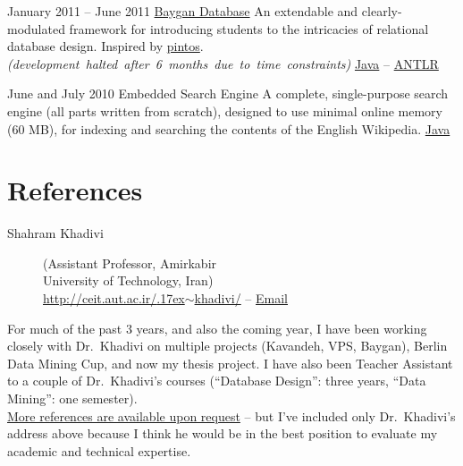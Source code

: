 \documentclass{tccv}
\renewcommand{\tilde}{\raise.17ex\hbox{$\scriptstyle\sim$}}
\begin{document}
{{\begin{project_list}
\vspace{-6pt}

\item{January 2011 -- June 2011}
	 {}
	 {\href{https://github.com/baygan/Baygan}{Baygan Database}}
	 {An extendable and clearly-modulated framework for introducing students to the intricacies of relational database design. Inspired by \href{http://www.stanford.edu/class/cs140/projects/pintos/pintos.html}{pintos}.\\[1.5pt]%
\mbox{\small\it(development halted after 6 months due to time constraints)}%
}
	 {%
	 	\href{http://www.oracle.com/technetwork/java/}{Java} -- %
		\href{http://www.antlr.org}{ANTLR}%
	 }

\vspace{-6pt}
	 
\item{June and July 2010}
	 {}
	 {Embedded Search Engine}
	 {A complete, single-purpose search engine (all parts \mbox{written} from scratch), designed to use minimal online memory (60 MB), for indexing and searching the contents of the English Wikipedia.}
	 {%
		 \href{http://www.oracle.com/technetwork/java/}{Java}%
	 }

\end{project_list}



\vspace{-10pt}










\section{References}

\begin{description}
\item[Shahram Khadivi] (Assistant Professor, Amirkabir \\University of Technology, Iran)
\\
\href{http://ceit.aut.ac.ir/~khadivi/}{http://ceit.aut.ac.ir/{\tilde}khadivi/} -- \href{mailto:khadivi@aut.ac.ir}{Email}
\end{description}
%
\vspace{-3pt}
For much of the past 3 years, and also the coming year, I have been working closely with Dr.\ Khadivi on \mbox{multiple} projects (Kavandeh, VPS, Baygan), Berlin Data \mbox{Mining} Cup, and now my thesis project. I have also been Teacher Assistant to a couple of Dr.\ Khadivi's courses (``Database Design'': three years, ``Data Mining'': one semester).
\\[6pt]
\uline{More references are available upon request} -- but I've \mbox{included} only Dr.\ Khadivi's address above because I think he would be in the best position to evaluate my academic and technical expertise.








}}
\end{document}
